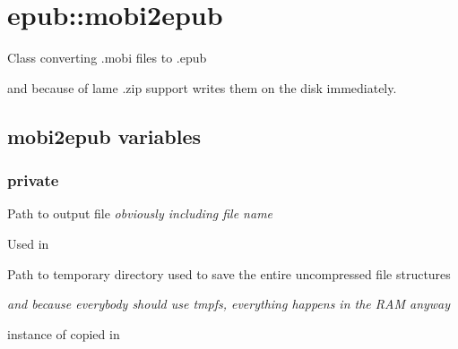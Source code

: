 \documentclass[letterpaper,10pt,english]{sphinxmanual}
\begin{document}
\section{epub::mobi2epub}
\label{epub:epub-mobi2epub}

\begin{fulllineitems}
\label{epub:epub::mobi2epub}
Class converting .mobi files to .epub

and because of lame
.zip support  writes them on the disk immediately.

\end{fulllineitems}



\subsection{mobi2epub variables}
\label{epub:mobi2epub-variables}

\subsubsection{private}
\label{epub:private}

\begin{fulllineitems}
\label{epub:path_out__boost::filesystem::path}
Path to output file \emph{obviously including file name}

Used in {\hyperref[epub:mobi2epub::directory_to_epubC]{}}

\end{fulllineitems}


\begin{fulllineitems}
\label{epub:path_tmp__boost::filesystem::path}
Path to temporary directory used to save the entire uncompressed file structures

\emph{and because everybody should use tmpfs, everything happens in the RAM anyway}

\end{fulllineitems}


\begin{fulllineitems}
\label{epub:m__mobi::mobireader}
instance of {\hyperref[mobireader:mobi::mobireader]{}} copied in {\hyperref[epub:mobi2epub::mobi2epub__mobi2epubR]{}}

\end{fulllineitems}
\end{document}
